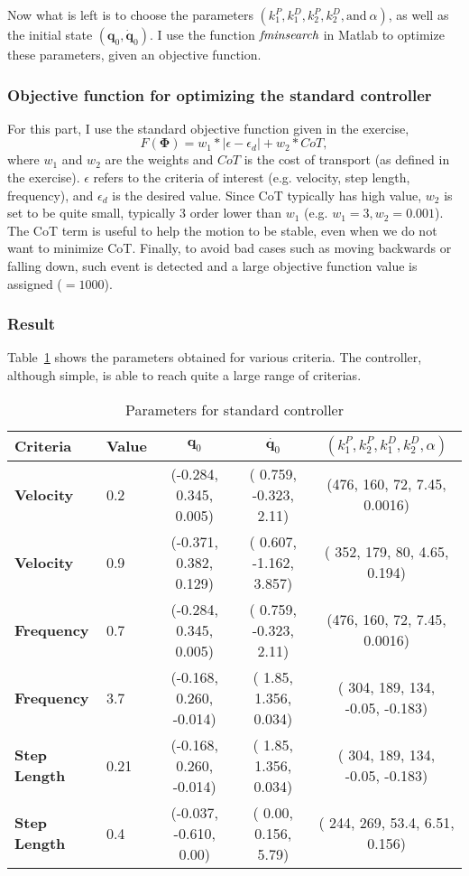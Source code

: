 Now what is left is to choose the parameters $(k_1^P, k_1^D, k_2^P, k_2^D, \text{and} ~ \alpha)$, as well as the initial state $(\bm{q}_0, \dot{\bm{q}}_0)$. I use the function $\emph{fminsearch}$ in Matlab to optimize these parameters, given an objective function. 

\subsubsection{Objective function for optimizing the standard controller}
For this part, I use the standard objective function given in the exercise,
\begin{equation}
F(\bm{\Phi}) = w_1*|\epsilon - \epsilon_d| + w_2*CoT,
\end{equation}
where $w_1$ and $w_2$ are the weights and $CoT$ is the cost of transport (as defined in the exercise). $\epsilon$ refers to the criteria of interest (e.g. velocity, step length, frequency), and $\epsilon_d$ is the desired value. Since CoT typically has high value, $w_2$ is set to be quite small, typically 3 order lower than $w_1$ (e.g. $w_1 = 3, w_2 = 0.001$). The CoT term is useful to help the motion to be stable, even when we do not want to minimize CoT. Finally, to avoid bad cases such as moving backwards or falling down, such event is detected and a large objective function value is assigned ($=1000$). 

\subsubsection{Result}
Table~\ref{tab:standard_result} shows the parameters obtained for various criteria. The controller, although simple, is able to reach quite a large range of criterias. 


\renewcommand{\arraystretch}{1.}
\begin{table}[h!]
	\centering    
      \caption{Parameters for standard controller}
      \label{tab:standard_result}
		
	\begin{tabular}{l l | c  c  c }
		\toprule
\bf{Criteria} & \bf{Value} & $\bm{q}_0$ & $\dot{\bm{q}_0}$ & $(k_1^P, k_2^P, k_1^D, k_2^D, \alpha)$ \\
\midrule
\bf{Velocity} & 0.2 & (-0.284, 0.345, 0.005) & ( 0.759, -0.323, 2.11) & (476, 160, 72, 7.45, 0.0016) \\
\bf{Velocity} & 0.9 & (-0.371,   0.382,   0.129) & (  0.607,  -1.162,   3.857) & ( 352, 179,  80,   4.65,   0.194) \\
\bf{Frequency} & 0.7 & (-0.284, 0.345, 0.005) & ( 0.759, -0.323, 2.11) & (476, 160, 72, 7.45, 0.0016) \\
\bf{Frequency} & 3.7 & (-0.168, 0.260, -0.014) & ( 1.85, 1.356, 0.034) & ( 304, 189, 134, -0.05, -0.183) \\
\bf{Step Length} & 0.21 & (-0.168, 0.260, -0.014) & ( 1.85, 1.356, 0.034) & ( 304, 189, 134, -0.05, -0.183) \\
\bf{Step Length} & 0.4 & (-0.037, -0.610, 0.00) & ( 0.00, 0.156, 5.79) & ( 244, 269, 53.4, 6.51, 0.156) 
	\end{tabular}
\end{table}